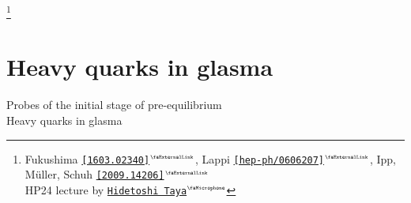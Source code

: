 \documentclass[aspectratio=169,11pt,usenames,dvipsnames]{beamer}
\renewcommand{\thefootnote}{\color{customblue}\faPaperPlaneO}
\newcommand\blfootnote[1]{%
  \begingroup
  \renewcommand\thefootnote{}\footnote{#1}%
  \addtocounter{footnote}{-1}%
  \endgroup
}
\begin{document}
\begin{frame}
\begin{columns}[onlytextwidth,t]
    \end{columns}
    \blfootnote{\scriptsize Fukushima \href{https://arxiv.org/abs/1603.02340}{{\color{palteal}\texttt{[1603.02340]}$^\text{\tiny\faExternalLink}$}}, Lappi \href{https://arxiv.org/abs/hep-ph/0606207}{{\color{palviolet}\texttt{[hep-ph/0606207]}$^\text{\tiny\faExternalLink}$}}, Ipp, Müller, Schuh \href{https://arxiv.org/abs/2009.14206}{{\color{palgold}\texttt{[2009.14206]}$^\text{\tiny\faExternalLink}$}}\\
    \hspace{16.5pt}HP24 lecture by \href{https://indico.cern.ch/event/1339555/contributions/6085516/}{{\color{starrysecond}\texttt{Hidetoshi Taya}$^\text{\tiny\faMicrophone}$}}
    }
\end{frame}



\section{Heavy quarks in glasma}


\begin{frame}{}
    \begin{center}
        \vspace{1cm}
        {\large\color{normal}Probes of the initial stage of pre-equilibrium}\\[0.3cm]
        {\huge\color{destacado}Heavy quarks in glasma}\\[0.3cm]
    \end{center}
\end{frame}
\end{document}
